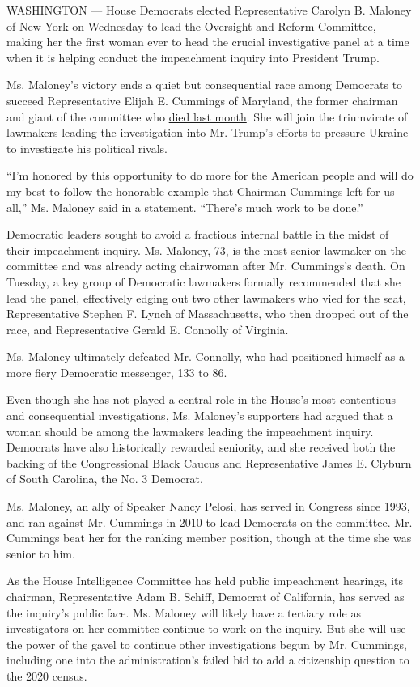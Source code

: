 WASHINGTON --- House Democrats elected Representative Carolyn B. Maloney
of New York on Wednesday to lead the Oversight and Reform Committee,
making her the first woman ever to head the crucial investigative panel
at a time when it is helping conduct the impeachment inquiry into
President Trump.

Ms. Maloney's victory ends a quiet but consequential race among
Democrats to succeed Representative Elijah E. Cummings of Maryland, the
former chairman and giant of the committee who
\href{https://www.nytimes3xbfgragh.onion/2019/10/17/us/politics/elijah-cummings-death-illness.html}{died
last month}. She will join the triumvirate of lawmakers leading the
investigation into Mr. Trump's efforts to pressure Ukraine to
investigate his political rivals.

``I'm honored by this opportunity to do more for the American people and
will do my best to follow the honorable example that Chairman Cummings
left for us all,'' Ms. Maloney said in a statement. ``There's much work
to be done.''

Democratic leaders sought to avoid a fractious internal battle in the
midst of their impeachment inquiry. Ms. Maloney, 73, is the most senior
lawmaker on the committee and was already acting chairwoman after Mr.
Cummings's death. On Tuesday, a key group of Democratic lawmakers
formally recommended that she lead the panel, effectively edging out two
other lawmakers who vied for the seat, Representative Stephen F. Lynch
of Massachusetts, who then dropped out of the race, and Representative
Gerald E. Connolly of Virginia.

Ms. Maloney ultimately defeated Mr. Connolly, who had positioned himself
as a more fiery Democratic messenger, 133 to 86.

Even though she has not played a central role in the House's most
contentious and consequential investigations, Ms. Maloney's supporters
had argued that a woman should be among the lawmakers leading the
impeachment inquiry. Democrats have also historically rewarded
seniority, and she received both the backing of the Congressional Black
Caucus and Representative James E. Clyburn of South Carolina, the No. 3
Democrat.

Ms. Maloney, an ally of Speaker Nancy Pelosi, has served in Congress
since 1993, and ran against Mr. Cummings in 2010 to lead Democrats on
the committee. Mr. Cummings beat her for the ranking member position,
though at the time she was senior to him.

As the House Intelligence Committee has held public impeachment
hearings, its chairman, Representative Adam B. Schiff, Democrat of
California, has served as the inquiry's public face. Ms. Maloney will
likely have a tertiary role as investigators on her committee continue
to work on the inquiry. But she will use the power of the gavel to
continue other investigations begun by Mr. Cummings, including one into
the administration's failed bid to add a citizenship question to the
2020 census.

